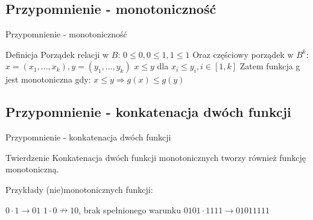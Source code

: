 \documentclass{if-beamer}
\begin{document}
\subsection{Przypomnienie - monotoniczność}
\begin{frame}{Przypomnienie - monotoniczność}

\begin{block}{Definicja}
\centering
Porządek relacji w $B$:
\linebreak\linebreak
$ 0 \leqslant 0, 0 \leqslant 1, 1 \leqslant 1 $
\linebreak\linebreak
Oraz częściowy porządek w $B^{k}$:
\linebreak\linebreak
$ x = (x_{1}, ... , x_{k}), y = (y_{1}, ... , y_{k}) $ 
\linebreak\linebreak
$ x \leqslant y $ dla $ x_{i} \leqslant y_{i}, i \in [1, k] $
\linebreak\linebreak
Zatem funkcja g jest monotoniczna gdy:
\linebreak\linebreak
$ x \leqslant y \Rightarrow g(x) \leqslant g(y) $
\end{block}

\end{frame}

\subsection{Przypomnienie - konkatenacja dwóch funkcji}
\begin{frame}{Przypomnienie - konkatenacja dwóch funkcji}

\begin{block}{Twierdzenie}
\centering
Konkatenacja dwóch funkcji monotonicznych tworzy również funkcję monotoniczną. 
\end{block}
\begin{flushleft}
Przykłady (nie)monotonicznych funkcji:
\begin{large}
\linebreak\linebreak
$ 0 \cdot 1 \rightarrow 01 $
\linebreak\linebreak
$ 1 \cdot 0 \nrightarrow 10 $, brak spełnionego warunku
\linebreak\linebreak
$ 0101 \cdot 1111 \rightarrow 0101 1111 $
\end{large}
\end{flushleft}
\end{frame}
\end{document}
